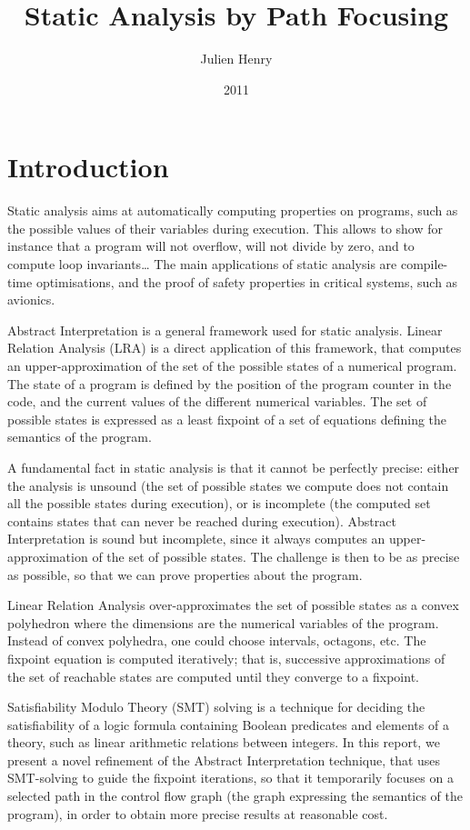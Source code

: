 \documentclass[a4paper,english,titlepage,11pt]{report}
\title{Static Analysis by Path Focusing}
\author{Julien Henry}
\date{2011}
\institute{Grenoble-INP}
\begin{document}
  
  \maketitlepage

  \tableofcontents
  
  \newpage



\chapter{Introduction} 

Static analysis aims at automatically computing properties on programs, such as
the possible values of their variables during execution. This allows to show for
instance that a program will not overflow, will not divide by zero, and to compute
loop invariants\dots
The main applications of static analysis are compile-time optimisations, and
the proof of safety properties in critical systems, such as avionics.

Abstract Interpretation is a general framework used for static analysis.
Linear Relation Analysis (LRA) is a direct application of this framework, that
computes an upper-approximation of the set of the possible states of a numerical
program. The state of a program is defined by the position of the program
counter in the code, and the current values of the different numerical variables.
The set of possible states is expressed as a least fixpoint of a set of
equations defining the semantics of the program. 

A fundamental fact in static analysis is that it cannot be perfectly precise:
either the analysis is unsound (the set of possible states we compute does not contain all
the possible states during execution), or is incomplete (the computed set
contains states that can never be reached during execution). 
Abstract Interpretation is sound but incomplete, since it always computes an
upper-approximation of the set of possible states. The challenge is then to be
as precise as possible, so that we can prove properties about the program.

Linear Relation Analysis over-approximates the set of possible states as a
convex polyhedron where the dimensions are the numerical variables of the
program.
Instead of convex polyhedra, one could choose intervals, octagons, etc.
The fixpoint equation is computed iteratively; that is, successive
approximations of the set of reachable states are computed until they converge
to a fixpoint. 

Satisfiability Modulo Theory (SMT) solving is a technique
for deciding the satisfiability of a logic formula containing Boolean
predicates and elements of a theory, such as linear arithmetic relations between
integers.
In this report, we present a novel refinement of the Abstract Interpretation
technique, that uses SMT-solving to guide the fixpoint iterations, so that it
temporarily focuses on a selected path in the control flow graph (the graph
expressing the semantics of the program), in order to
obtain more precise results at reasonable cost.
\end{document}

